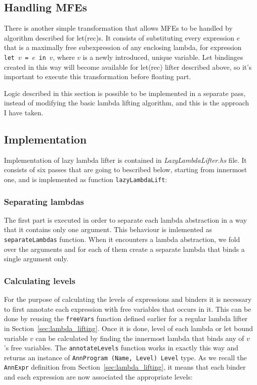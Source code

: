 \documentclass[12pt,a4paper]{report}
\begin{document}
\subsection{Handling MFEs}
There is another simple transformation that allows MFEs to be handled by
algorithm described for let(rec)s. It consists of substituting every expression
$e$ that is a maximally free subexpression of any enclosing lambda, for
expression \texttt{let $v$ = $e$ in $v$}, where $v$ is a newly introduced,
unique variable. Let bindinges created in this way will become available for
let(rec) lifter described above, so it's important to execute this
transformation before floating part.

Logic described in this section is possible to be implemented in a separate
pass, instead of modifying the basic lambda lifting algorithm, and this is the
approach I have taken.

\subsection{Implementation}
Implementation of lazy lambda lifter is contained in
\textit{LazyLambdaLifter.hs} file. It consists of six passes that are going to
bescribed below, starting from innermost one, and is implemented as function
\texttt{lazyLambdaLift}:

\vspace*{0.2in}

\subsubsection{Separating lambdas}
The first part is executed in order to separate each lambda abstraction in a
way that it contains only one argument. This behaviour is imlemented as
\texttt{separateLambdas} function. When it encounters a lambda abstraction, we
fold over the arguments and for each of them create a separate lambda that
binds a single argument only.

\subsubsection{Calculating levels}
For the purpose of calculating the levels of expressions and binders it is
necessary to first annotate each expression with free variables that occurs in
it. This can be done by reusing the \texttt{freeVars} function defined earlier
for a regular lambda lifter in Section~\ref{sec:lambda_lifting}. Once it is
done, level of each lambda or let bound variable $v$ can be calculated by
finding the innermost lambda that binds any of $v$'s free variables. The
\texttt{annotateLevels} function works in exactly this way and returns an
instance of \texttt{AnnProgram (Name, Level) Level} type. As we recall the
\texttt{AnnExpr} definition from Section~\ref{sec:lambda_lifting}, it means
that each binder and each expression are now associated the appropriate levels:
\end{document}
